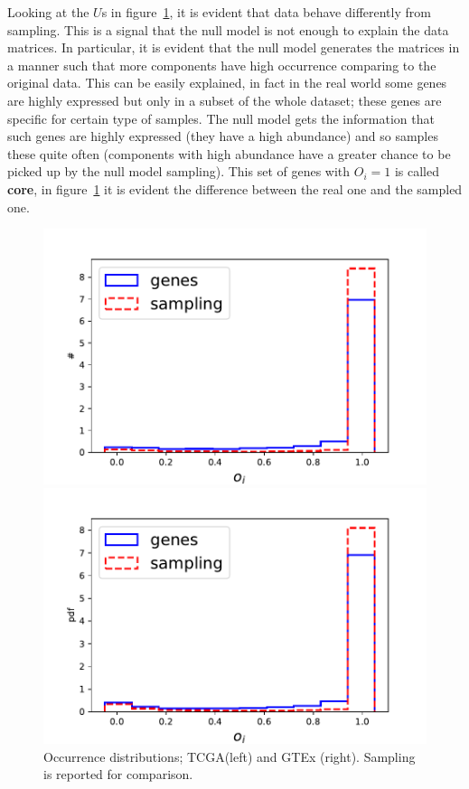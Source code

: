 Looking at the $U$s in figure~\ref{fig:structure/globalU_null}, it is evident that data behave differently from sampling. This is a signal that the null model is not enough to explain the data matrices. In particular, it is evident that the null model generates the matrices in a manner such that more components have high occurrence comparing to the original data. This can be easily explained, in fact in the real world some genes are highly expressed but only in a subset of the whole dataset; these genes are specific for certain type of samples. The null model gets the information that such genes are highly expressed (they have a high abundance) and so samples these quite often (components with high abundance have a greater chance to be picked up by the null model sampling). This set of genes with $O_i=1$ is called \textbf{core}, in figure~\ref{fig:structure/globalU_null} it is evident the difference between the real one and the sampled one.
\begin{figure}[htb!]
\begin{minipage}{0.5\textwidth}
    \centering
    \includegraphics[width=0.95\linewidth]{pictures/structure/tcga/globalU_null.pdf}
\end{minipage}
\hspace{2mm}
\begin{minipage}{0.5\textwidth}
    \centering
    \includegraphics[width=0.95\linewidth]{pictures/structure/gtex/globalU_null.pdf}
    \end{minipage}
\caption{Occurrence distributions; TCGA(left) and GTEx (right). Sampling is reported for comparison.}
\label{fig:structure/globalU_null}
\end{figure}

